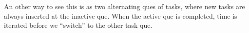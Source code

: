 An other way to see this is as two alternating ques of tasks, where new tasks are always inserted at the inactive que. 
When the active que is completed, time is iterated before we ``switch'' to the other task que.

\newpage



	








